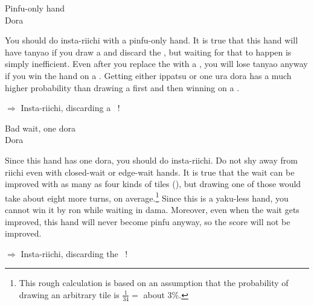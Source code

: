 \begin{itembox}[r]{{\jap Pinfu}-only hand}
\bp
{}~~\bei\\
\hspace{311pt}\footnotesize{\jap Dora}
\ep {}
\vspace{-15pt}
\end{itembox}

\noindent You should do insta-{\jap riichi} with a {\jap pinfu}-only hand. It is true that this hand will have {\jap tanyao} if you draw a {\large {}} and discard the {\large {}}, but waiting for that to happen is simply inefficient. Even after you replace the {\large{}} with a {\large{}}, you will lose {\jap tanyao} anyway if you win the hand on a {\large{}}. Getting either {\jap ippatsu} or one {\jap ura dora} has a much higher probability than drawing a {\large {}} first and then winning on a {\large {}}. 

\begin{center}
{\large $\Rightarrow$ Insta-{\jap riichi}, discarding a ~!}
\end{center}

\bigskip
\begin{itembox}[r]{Bad wait, one {\jap dora}}
\bp
{}\bei\bei\bei\xi~~\\
\hspace{311pt}\footnotesize{\jap Dora}
\ep
\vspace{-15pt}
\end{itembox}

\noindent Since this hand has one {\jap dora}, you should do insta-{\jap riichi}. Do not shy away from {\jap riichi} even with closed-wait or edge-wait hands. It is true that the wait can be improved with as many as four kinds of tiles ({\large {}}), but drawing one of those would take about eight more turns, on average.\footnote{This rough calculation is based on an assumption that the probability of drawing an arbitrary tile is $\frac{1}{34}=$ about 3\%.} 
Since this is a {\jap yaku}-less hand, you cannot win it by {\jap ron} while waiting in {\jap dama}.  
Moreover, even when the wait gets improved, this hand will never become {\jap pinfu} anyway, so the score will not be improved. 

\begin{center}
{\large $\Rightarrow$ Insta-{\jap riichi}, discarding the \xi ~!}
\end{center}

